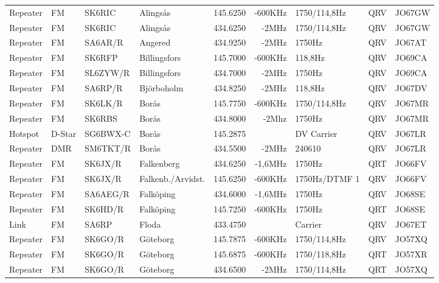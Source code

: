 \begin{landscape}
\begin{longtable}{llllrrlcl}
Repeater & FM     & SK6RIC   & Alingsås            & 145.6250  & -600KHz & 1750/114,8Hz    & QRV  & JO67GW \\
Repeater & FM     & SK6RIC   & Alingsås            & 434.6250  & -2MHz   & 1750/114,8Hz    & QRV  & JO67GW \\
Repeater & FM     & SA6AR/R  & Angered             & 434.9250  & -2MHz   & 1750Hz          & QRV  & JO67AT \\
Repeater & FM     & SK6RFP   & Billingsfors        & 145.7000  & -600KHz & 118,8Hz         & QRV  & JO69CA \\
Repeater & FM     & SL6ZYW/R & Billingsfors        & 434.7000  & -2MHz   & 1750Hz          & QRV  & JO69CA \\
Repeater & FM     & SA6RP/R  & Björboholm          & 434.8250  & -2MHz   & 118,8Hz         & QRV  & JO67DV \\
Repeater & FM     & SK6LK/R  & Borås               & 145.7750  & -600KHz & 1750/114,8Hz    & QRV  & JO67MR \\
Repeater & FM     & SK6RBS   & Borås               & 434.8000  & -2Mhz   & 1750Hz          & QRV  & JO67MR \\
Hotspot  & D-Star & SG6BWX-C & Borås               & 145.2875  &         & DV Carrier      & QRV  & JO67LR \\
Repeater & DMR    & SM6TKT/R & Borås               & 434.5500  & -2MHz   & 240610          & QRV  & JO67LR \\
Repeater & FM     & SK6JX/R  & Falkenberg          & 434.6250  & -1,6MHz & 1750Hz          & QRT  & JO66FV \\
Repeater & FM     & SK6JX/R  & Falkenb./Arvidst.   & 145.6250  & -600KHz & 1750Hz/DTMF 1   & QRV  & JO66FV \\
Repeater & FM     & SA6AEG/R & Falköping           & 434.6000  & -1,6MHz & 1750Hz          & QRV  & JO68SE \\
Repeater & FM     & SK6HD/R  & Falköping           & 145.7250  & -600KHz & 1750Hz          & QRT  & JO68SE \\
Link     & FM     & SA6RP    & Floda               & 433.4750  &         & Carrier         & QRV  & JO67ET \\
Repeater & FM     & SK6GO/R  & Göteborg            & 145.7875  & -600KHz & 1750/114,8Hz    & QRV  & JO57XQ \\
Repeater & FM     & SK6GO/R  & Göteborg            & 145.6875  & -600KHz & 1750/118,8Hz    & QRT  & JO57XR \\
Repeater & FM     & SK6GO/R  & Göteborg            & 434.6500  & -2MHz   & 1750/114,8Hz    & QRT  & JO57XQ \\

\end{longtable}
\end{landscape}
